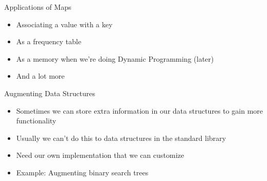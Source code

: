 \documentclass[10pt]{beamer}
\newcommand{\bi}{\begin{itemize}}
\newcommand{\ei}{\end{itemize}}
\begin{document}
\begin{frame}{Applications of Maps}
    \bi
        \item Associating a value with a key
        \item As a frequency table
        \item As a memory when we're doing Dynamic Programming (later)
        \item And a lot more
    \ei
\end{frame}

\begin{frame}{Augmenting Data Structures}
    \bi
        \item Sometimes we can store extra information in our data structures to gain more functionality
        \item Usually we can't do this to data structures in the standard library
        \item Need our own implementation that we can customize
        \item Example: Augmenting binary search trees
    \ei
\end{frame}
\end{document}
